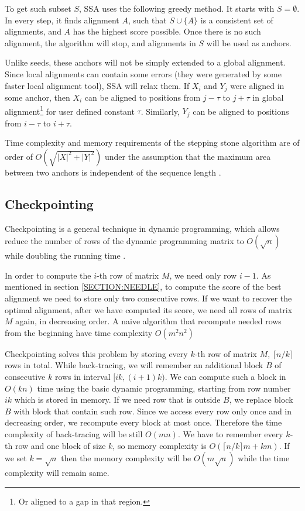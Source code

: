 To get such subset $S$, SSA uses the following greedy method. It starts with
$S=\emptyset$. In every step, it finds alignment $A$, such that $S\cup\{A\}$ is
a consistent set of alignments, and $A$ has the highest score possible. Once there is no
such alignment, the algorithm will stop, and alignments in  $S$
will be used as anchors.

Unlike seeds, these anchors will not be simply extended to a global alignment. Since
local alignments can contain some errors (they were generated by some faster
local alignment tool), SSA will relax them. If $X_i$ and $Y_j$ were aligned in
some anchor, then $X_i$ can be aligned to positions from $j-\tau$ to $j+\tau$ in
global alignment\footnote{Or aligned to a gap in that region.} for user defined
constant $\tau$. Similarly, $Y_j$ can be aligned to positions from $i-\tau$ to
$i+\tau$.

Time complexity and memory requirements of the stepping stone algorithm are of
order of $O(\sqrt{|X|^2+|Y|^2})$ under the assumption that the maximum area between
two anchors is independent of the sequence length \cite{Meyer2002}.


\subsection{Checkpointing}

Checkpointing is a general technique in dynamic programming, which allows reduce
the number of rows of the dynamic programming matrix to $O(\sqrt n)$ while
doubling the running time
\cite{Grice1997}. 

In order to compute the $i$-th row of matrix $M$, we need only row $i-1$. As
mentioned in section \ref{SECTION:NEEDLE}, to compute the score of the best
alignment we need to store only
two consecutive rows.  If we want to
recover the optimal alignment, after we have computed its score, we need all
rows of matrix $M$ again, in decreasing order.
A naive algorithm that recompute needed rows from the beginning have
time complexity $O(m^2n^2)$

Checkpointing solves this problem by storing every $k$-th row of matrix $M$,
$\lceil n/k\rceil$ rows in total.  While back-tracing, we
will remember an additional block $B$ of consecutive $k$ rows in interval
$[ik,(i+1)k)$. We can compute such a block in $O(kn)$ time using the basic
 dynamic programming, starting from row number $ik$ which is stored in memory.  If we need row that
is outside $B$, we replace block $B$ with block that contain such row. Since we
access every row only once and in decreasing order, we recompute every block at
most once. Therefore the time complexity of back-tracing will be still $O(mn)$. We
have to remember every $k$-th row and one block of size $k$, so memory
complexity is $O(\lceil n/k\rceil m+ km)$. If we set $k=\sqrt n$ then the memory
complexity will be $O(m\sqrt n)$ while the time complexity will remain same.

